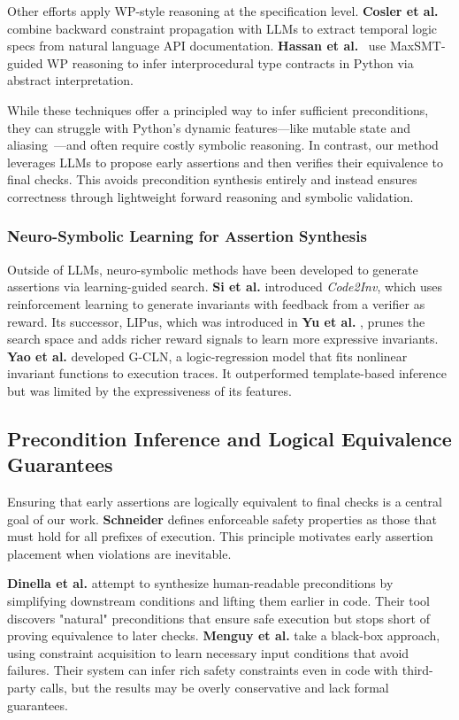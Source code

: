\documentclass[8pt]{extarticle}
\begin{document}
Other efforts apply WP-style reasoning at the specification level. \textbf{Cosler et al.}~\cite{cosler2023nl2spec} combine backward constraint propagation with LLMs to extract temporal logic specs from natural language API documentation. \textbf{Hassan et al.}~\cite{xu2018typpete} use MaxSMT-guided WP reasoning to infer interprocedural type contracts in Python via abstract interpretation.

While these techniques offer a principled way to infer sufficient preconditions, they can struggle with Python’s dynamic features—like mutable state and aliasing~\cite{guarnieri2024approximate}—and often require costly symbolic reasoning. In contrast, our method leverages LLMs to propose early assertions and then verifies their equivalence to final checks. This avoids precondition synthesis entirely and instead ensures correctness through lightweight forward reasoning and symbolic validation.

\subsubsection{Neuro-Symbolic Learning for Assertion Synthesis}
Outside of LLMs, neuro-symbolic methods have been developed to generate assertions via learning-guided search. \textbf{Si et al.} \cite{Si2018-Code2Inv} introduced \textit{Code2Inv}, which uses reinforcement learning to generate invariants with feedback from a verifier as reward. Its successor, LIPus, which was introduced in \textbf{Yu et al.} \cite{Yu2023-LIPUS}, prunes the search space and adds richer reward signals to learn more expressive invariants. \textbf{Yao et al.} \cite{Yao2020-GCLN} developed G-CLN, a logic-regression model that fits nonlinear invariant functions to execution traces. It outperformed template-based inference but was limited by the expressiveness of its features.

\subsection{Precondition Inference and Logical Equivalence Guarantees}
Ensuring that early assertions are logically equivalent to final checks is a central goal of our work. \textbf{Schneider} \cite{schneider2000} defines enforceable safety properties as those that must hold for all prefixes of execution. This principle motivates early assertion placement when violations are inevitable.

\textbf{Dinella et al.} \cite{Dinella2024-NatPrecondition} attempt to synthesize human-readable preconditions by simplifying downstream conditions and lifting them earlier in code. Their tool discovers "natural" preconditions that ensure safe execution but stops short of proving equivalence to later checks. \textbf{Menguy et al.} \cite{Menguy2022-PRECA} take a black-box approach, using constraint acquisition to learn necessary input conditions that avoid failures. Their system can infer rich safety constraints even in code with third-party calls, but the results may be overly conservative and lack formal guarantees.
\end{document}
